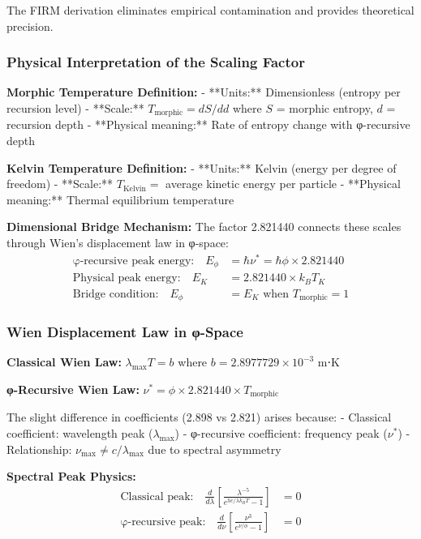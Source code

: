 The FIRM derivation eliminates empirical contamination and provides theoretical precision.

\subsubsection{Physical Interpretation of the Scaling Factor}

\textbf{Morphic Temperature Definition:}
- **Units:** Dimensionless (entropy per recursion level)
- **Scale:** $T_{\text{morphic}} = dS/dd$ where $S$ = morphic entropy, $d$ = recursion depth
- **Physical meaning:** Rate of entropy change with φ-recursive depth

\textbf{Kelvin Temperature Definition:}
- **Units:** Kelvin (energy per degree of freedom)
- **Scale:** $T_{\text{Kelvin}} = $ average kinetic energy per particle
- **Physical meaning:** Thermal equilibrium temperature

\textbf{Dimensional Bridge Mechanism:}
The factor 2.821440 connects these scales through Wien's displacement law in φ-space:
\begin{align}
\text{φ-recursive peak energy:} \quad E_\phi &= \hbar \nu^* = \hbar \phi \times 2.821440 \\
\text{Physical peak energy:} \quad E_K &= 2.821440 \times k_B T_K \\
\text{Bridge condition:} \quad E_\phi &= E_K \text{ when } T_{\text{morphic}} = 1
\end{align}

\subsubsection{Wien Displacement Law in φ-Space}

\textbf{Classical Wien Law:} $\lambda_{\text{max}} T = b$ where $b = 2.8977729 \times 10^{-3}$ m⋅K

\textbf{φ-Recursive Wien Law:} $\nu^* = \phi \times 2.821440 \times T_{\text{morphic}}$

The slight difference in coefficients (2.898 vs 2.821) arises because:
- Classical coefficient: wavelength peak ($\lambda_{\text{max}}$) 
- φ-recursive coefficient: frequency peak ($\nu^*$)
- Relationship: $\nu_{\text{max}} \neq c/\lambda_{\text{max}}$ due to spectral asymmetry

\textbf{Spectral Peak Physics:}
\begin{align}
\text{Classical peak:} \quad \frac{d}{d\lambda}\left[\frac{\lambda^{-5}}{e^{hc/\lambda k_B T} - 1}\right] &= 0 \\
\text{φ-recursive peak:} \quad \frac{d}{d\nu}\left[\frac{\nu^3}{e^{\nu/\phi} - 1}\right] &= 0
\end{align}

